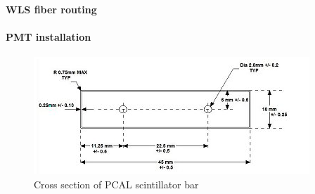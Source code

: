 \paragraph{WLS fiber routing}
\paragraph{PMT installation}

\begin{figure}
\centering
\includegraphics[scale=1.0]{images/pcal_bar_cross_section.png}
\caption{Cross section of PCAL scintillator bar}
\label{pcal-bar-xsec}
\end{figure}







